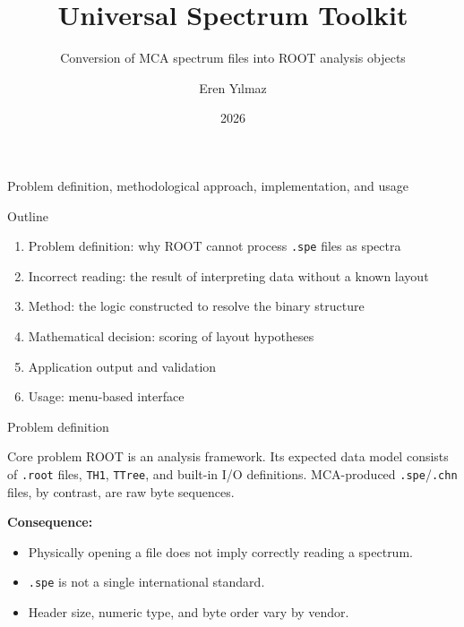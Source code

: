 \documentclass[aspectratio=169,11pt]{beamer}
\title{Universal Spectrum Toolkit}
\subtitle{Conversion of MCA spectrum files into ROOT analysis objects}
\author{Eren Yılmaz}
\institute{Technical presentation}
\date{2026}
\begin{document}
\begin{frame}[plain]
  \titlepage
  \vspace{-0.4em}
  \begin{center}
    \small\textcolor{ustgray}{Problem definition, methodological approach, implementation, and usage}
  \end{center}
\end{frame}

\begin{frame}{Outline}
  \begin{enumerate}
    \item Problem definition: why ROOT cannot process \texttt{.spe} files as spectra
    \item Incorrect reading: the result of interpreting data without a known layout
    \item Method: the logic constructed to resolve the binary structure
    \item Mathematical decision: scoring of layout hypotheses
    \item Application output and validation
    \item Usage: menu-based interface
  \end{enumerate}
\end{frame}

\begin{frame}{Problem definition}
  \begin{alertblock}{Core problem}
    ROOT is an analysis framework. Its expected data model consists of
    \texttt{.root} files, \texttt{TH1}, \texttt{TTree}, and built-in I/O definitions.
    MCA-produced \texttt{.spe}/\texttt{.chn} files, by contrast, are raw byte sequences.
  \end{alertblock}

  \vspace{0.5em}
  \textbf{Consequence:}
  \begin{itemize}
    \item Physically opening a file does not imply correctly reading a spectrum.
    \item \texttt{.spe} is not a single international standard.
    \item Header size, numeric type, and byte order vary by vendor.
  \end{itemize}
\end{frame}
\end{document}
